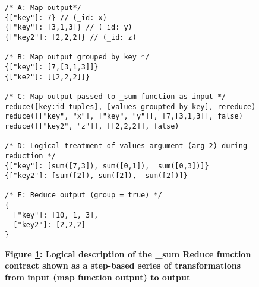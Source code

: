 \begin{figure}[H]
    \centering
    \begin{mdframed}[rightline=true,leftline=true]
        \begin{verbatim}
/* A: Map output*/
{["key"]: 7} // (_id: x)
{["key"]: [3,1,3]} // (_id: y)
{["key2"]: [2,2,2]} // (_id: z)

/* B: Map output grouped by key */
{["key"]: [7,[3,1,3]]}
{["ke2"]: [[2,2,2]]}

/* C: Map output passed to _sum function as input */
reduce([key:id tuples], [values groupted by key], rereduce)
reduce([["key", "x"], ["key", "y"]], [7,[3,1,3]], false)
reduce([["key2", "z"]], [[2,2,2]], false)

/* D: Logical treatment of values argument (arg 2) during reduction */
{["key"]: [sum([7,3]), sum([0,1]),  sum([0,3])]}
{["key2"]: [sum([2]), sum([2]),  sum([2])]}

/* E: Reduce output (group = true) */
{
  ["key"]: [10, 1, 3],
  ["key2"]: [2,2,2]
}
    \end{verbatim}
    \end{mdframed}
    \caption[\_sum Reduce Function Logic]{\textbf{Figure \ref{fig-sum-reduce-fn}: Logical description of the \_sum Reduce function contract shown as a step-based series of transformations from input (map function output) to output}}
    \label{fig-sum-reduce-fn}
\end{figure}